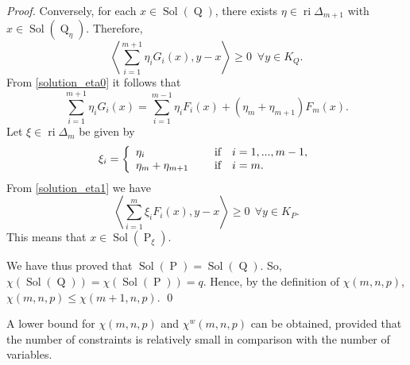 \documentclass[smallextended,envcountsect]{svjour3}       %
\DeclareMathOperator{\Sol}{Sol}
\DeclareMathOperator{\Pa}{P}
\DeclareMathOperator{\Q}{Q}
\DeclareMathOperator{\ri}{ri}
\begin{document}
\begin{proof}
Conversely, for each $x\in\Sol(\Q)$, there exists $\eta\in \ri\Delta_{m+1}$ with $x\in \Sol(\Q_{\eta})$. Therefore,
\begin{equation}\label{solution_eta1}
\left\langle   \sum_{i=1}^{m+1}\eta_iG_i(x),y-x\right\rangle  \geq 0 \ \; \forall y\in K_Q.\end{equation}
From \eqref{solution_eta0} it follows that
	$$\sum_{i=1}^{m+1}\eta_iG_i(x)=\sum_{i=1}^{m-1}\eta_iF_i(x)+(\eta_m+\eta_{m+1})F_m(x).$$
Let $\xi\in \ri\Delta_m$ be given by
$$\xi_i=\left\{\begin{array}{ll}
\eta_i& \quad \hbox{ if } \ \ i=1,...,m-1,  \\
\eta_m+\eta_{m+1}& \quad \hbox{ if } \ \ i=m.  \\
\end{array}\right.$$
From \eqref{solution_eta1} we have 
$$\left\langle  \sum_{i=1}^m\xi_iF_i(x),y-x \right\rangle \geq 0  \ \ \forall y\in K_P.$$
This means that $x\in \Sol(\Pa_{\xi})$.

We have thus proved that $\Sol(\Pa)=\Sol(\Q)$. So, $\chi(\Sol(\Q))=\chi(\Sol(\Pa))=q$. Hence, by the definition of $\chi(m,n,p)$, $\chi(m,n,p) \leq \chi(m+1,n,p)$. 
 \qed
\end{proof}


A lower bound for $\chi(m,n,p)$ and $\chi^w(m,n,p)$ can be obtained, provided that the number of constraints is relatively small in comparison with the number of variables.  
\end{document}
